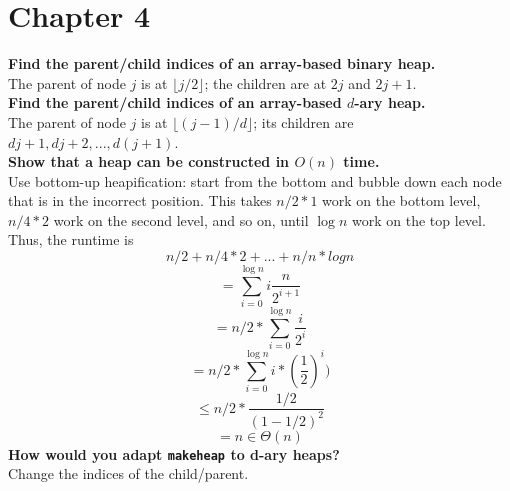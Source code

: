\section{Chapter 4}

\begin{problem}{4.16}
\textbf{Find the parent/child indices of an array-based binary heap.}
\\
The parent of node $j$ is at $\lfloor{j}/2\rfloor$; the children are at $2j$ and $2j + 1$.
\\
\textbf{Find the parent/child indices of an array-based $d$-ary heap.}
\\
The parent of node $j$ is at $\lfloor{(j - 1) / d}\rfloor$; its children are $dj + 1, dj + 2, ..., d(j + 1)$.
\\
\textbf{Show that a heap can be constructed in $O(n)$ time.}
\\
Use bottom-up heapification: start from the bottom and bubble down each node that is in the incorrect position. This takes $n / 2 * 1$ work on the bottom level, $n / 4 * 2$ work on the second level, and so on, until $\log n$ work on the top level. Thus, the runtime is 
    \[
        n / 2 + n / 4 * 2 + ... + n / n * log n
    \]
    \[
        = \sum_{i = 0}^{\log n} i \frac{n}{2^{i + 1}}
    \]
    \[
        = n/2 * \sum_{i = 0}^{\log n} \frac{i}{2^i}
    \]
    \[
        = n/2 * \sum_{i = 0}^{\log n} i * (\frac{1}{2})^i)
    \]
    \[
        \leq n/2 * \frac{1/2}{(1 - 1/2)^2}
    \]
    \[
        = n \in \Theta(n)
    \]
\textbf{How would you adapt \texttt{makeheap} to d-ary heaps?}
\\ 
Change the indices of the child/parent.
\end{problem}
